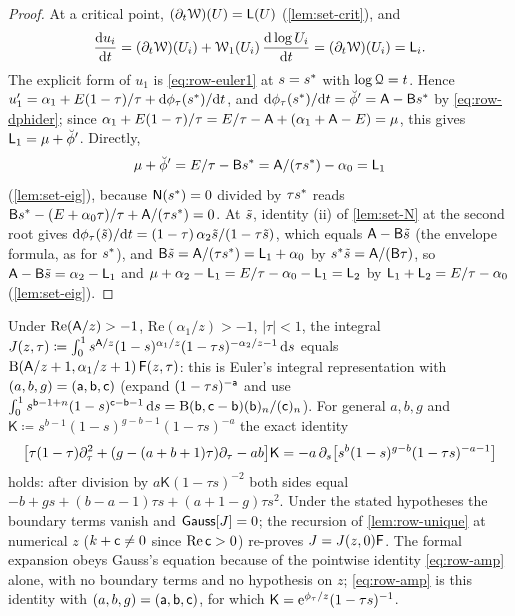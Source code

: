 \begin{proof}
At a critical point, $(\partial_t\mathcal{W})(U)=\mathsf{L}(U)$ (\cref{lem:set-crit}), and
\[
\frac{\mathrm{d} u_i}{\mathrm{d} t}=(\partial_t\mathcal{W})(U_i)+\mathcal{W}_1(U_i)\,\frac{\mathrm{d}\log U_i}{\mathrm{d} t}=(\partial_t\mathcal{W})(U_i)=\mathsf{L}_i .
\]
The explicit form of $u_1$ is \eqref{eq:row-euler1} at $s=s^{\ast}$ with $\log\mathcal{Q}=t$. Hence $u_1'=\alpha_1+E(1-\tau)/\tau+\mathrm{d}\phi_\tau(s^{\ast})/\mathrm{d} t$, and $\mathrm{d}\phi_\tau(s^{\ast})/\mathrm{d} t=\breve{\phi}'=\mathsf{A}-\mathsf{B}s^{\ast}$ by \eqref{eq:row-dphider}; since $\alpha_1+E(1-\tau)/\tau=E/\tau-\mathsf{A}+(\alpha_1+\mathsf{A}-E)=\mu$, this gives $\mathsf{L}_1=\mu+\breve{\phi}'$. Directly,
\[
\mu+\breve{\phi}'=E/\tau-\mathsf{B}s^{\ast}=\mathsf{A}/(\tau s^{\ast})-\alpha_0=\mathsf{L}_1
\]
(\cref{lem:set-eig}), because $\mathsf{N}(s^{\ast})=0$ divided by $\tau s^{\ast}$ reads $\mathsf{B}s^{\ast}-(E+\alpha_0\tau)/\tau+\mathsf{A}/(\tau s^{\ast})=0$. At $\tilde{s}$, identity (ii) of \cref{lem:set-N} at the second root gives $\mathrm{d}\phi_\tau(\tilde{s})/\mathrm{d} t=(1-\tau)\,\alpha_2\tilde{s}/(1-\tau\tilde{s})$, which equals $\mathsf{A}-\mathsf{B}\tilde{s}$ (the envelope formula, as for $s^{\ast}$), and $\mathsf{B}\tilde{s}=\mathsf{A}/(\tau s^{\ast})=\mathsf{L}_1+\alpha_0$ by $s^{\ast}\tilde{s}=\mathsf{A}/(\mathsf{B}\tau)$, so $\mathsf{A}-\mathsf{B}\tilde{s}=\alpha_2-\mathsf{L}_1$ and $\mu+\alpha_2-\mathsf{L}_1=E/\tau-\alpha_0-\mathsf{L}_1=\mathsf{L}_2$ by $\mathsf{L}_1+\mathsf{L}_2=E/\tau-\alpha_0$ (\cref{lem:set-eig}).
\end{proof}

\begin{rmk}
\label{rmk:row-eulerint}
Under $\mathrm{Re}(\mathsf{A}/z)>-1$, $\mathrm{Re}(\alpha_1/z)>-1$, $|\tau|<1$, the integral $J(z,\tau)\coloneqq\int_0^1s^{\mathsf{A}/z}(1-s)^{\alpha_1/z}(1-\tau s)^{-\alpha_2/z-1}\,\mathrm{d} s$ equals $\mathrm{B}(\mathsf{A}/z+1,\alpha_1/z+1)\,\mathsf{F}(z,\tau)$: this is Euler's integral representation with $(a,b,g)=(\mathsf{a},\mathsf{b},\mathsf{c})$ (expand $(1-\tau s)^{-\mathsf{a}}$ and use $\int_0^1s^{\mathsf{b}-1+n}(1-s)^{\mathsf{c}-\mathsf{b}-1}\,\mathrm{d} s=\mathrm{B}(\mathsf{b},\mathsf{c}-\mathsf{b})(\mathsf{b})_n/(\mathsf{c})_n$). For general $a,b,g$ and $\mathsf{K}\coloneqq s^{b-1}(1-s)^{g-b-1}(1-\tau s)^{-a}$ the exact identity
\[
\big[\tau(1-\tau)\partial_\tau^2+(g-(a+b+1)\tau)\partial_\tau-ab\big]\mathsf{K}=-a\,\partial_s\big[s^b(1-s)^{g-b}(1-\tau s)^{-a-1}\big]
\]
holds: after division by $a\mathsf{K}(1-\tau s)^{-2}$ both sides equal $-b+gs+(b-a-1)\tau s+(a+1-g)\tau s^2$. Under the stated hypotheses the boundary terms vanish and $\mathsf{Gauss}[J]=0$; the recursion of \cref{lem:row-unique} at numerical $z$ ($k+\mathsf{c}\neq0$ since $\mathrm{Re}\,\mathsf{c}>0$) re-proves $J=J(z,0)\mathsf{F}$. The formal expansion obeys Gauss's equation because of the pointwise identity \eqref{eq:row-amp} alone, with no boundary terms and no hypothesis on $z$; \eqref{eq:row-amp} is this identity with $(a,b,g)=(\mathsf{a},\mathsf{b},\mathsf{c})$, for which $\mathsf{K}=\mathrm{e}^{\phi_\tau/z}(1-\tau s)^{-1}$.
\end{rmk}
